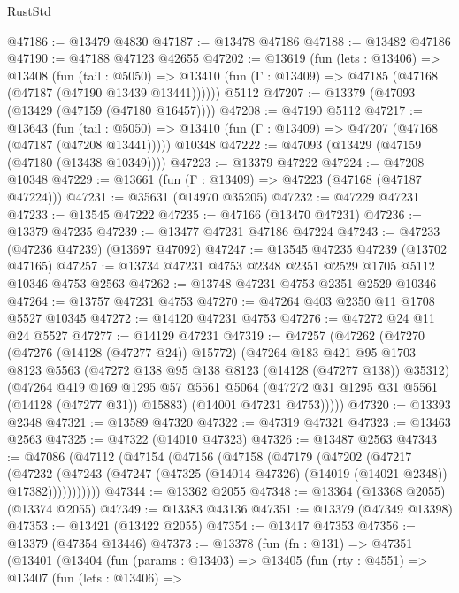 \begin{lexlean}{RustStd}
\begin{coremodule}
@47186 := @13479 @4830
@47187 := @13478 @47186
@47188 := @13482 @47186
@47190 := @47188 @47123 @42655
@47202 := @13619
    (fun (lets : @13406) =>
    @13408
      (fun (tail : @5050) =>
      @13410 (fun (Γ : @13409) => @47185 (@47168 (@47187 (@47190 @13439 @13441))))))
    @5112
@47207 := @13379 (@47093 (@13429 (@47159 (@47180 @16457))))
@47208 := @47190 @5112
@47217 := @13643
    (fun (tail : @5050) => @13410 (fun (Γ : @13409) => @47207 (@47168 (@47187 (@47208 @13441)))))
    @10348
@47222 := @47093 (@13429 (@47159 (@47180 (@13438 @10349))))
@47223 := @13379 @47222
@47224 := @47208 @10348
@47229 := @13661 (fun (Γ : @13409) => @47223 (@47168 (@47187 @47224)))
@47231 := @35631 (@14970 @35205)
@47232 := @47229 @47231
@47233 := @13545 @47222
@47235 := @47166 (@13470 @47231)
@47236 := @13379 @47235
@47239 := @13477 @47231 @47186 @47224
@47243 := @47233 (@47236 @47239) (@13697 @47092)
@47247 := @13545 @47235 @47239 (@13702 @47165)
@47257 := @13734 @47231 @4753 @2348 @2351 @2529 @1705 @5112 @10346 @4753 @2563
@47262 := @13748 @47231 @4753 @2351 @2529 @10346
@47264 := @13757 @47231 @4753
@47270 := @47264 @403 @2350 @11 @1708 @5527 @10345
@47272 := @14120 @47231 @4753
@47276 := @47272 @24 @11 @24 @5527
@47277 := @14129 @47231
@47319 := @47257
    (@47262
      (@47270
        (@47276 (@14128 (@47277 @24)) @15772)
        (@47264
          @183
          @421
          @95
          @1703
          @8123
          @5563
          (@47272 @138 @95 @138 @8123 (@14128 (@47277 @138)) @35312)
          (@47264
            @419
            @169
            @1295
            @57
            @5561
            @5064
            (@47272 @31 @1295 @31 @5561 (@14128 (@47277 @31)) @15883)
            (@14001 @47231 @4753)))))
@47320 := @13393 @2348
@47321 := @13589 @47320
@47322 := @47319 @47321
@47323 := @13463 @2563
@47325 := @47322 (@14010 @47323)
@47326 := @13487 @2563
@47343 := @47086
    (@47112
      (@47154
        (@47156
          (@47158
            (@47179
              (@47202
                (@47217
                  (@47232
                    (@47243
                      (@47247 (@47325 (@14014 @47326) (@14019 (@14021 @2348)) @17382)))))))))))
@47344 := @13362 @2055
@47348 := @13364 (@13368 @2055) (@13374 @2055)
@47349 := @13383 @43136
@47351 := @13379 (@47349 @13398)
@47353 := @13421 (@13422 @2055)
@47354 := @13417 @47353
@47356 := @13379 (@47354 @13446)
@47373 := @13378
    (fun (fn : @131) =>
    @47351
      (@13401
        (@13404
          (fun (params : @13403) =>
          @13405
            (fun (rty : @4551) =>
            @13407
              (fun (lets : @13406) =>

\end{coremodule}
\end{lexlean}
